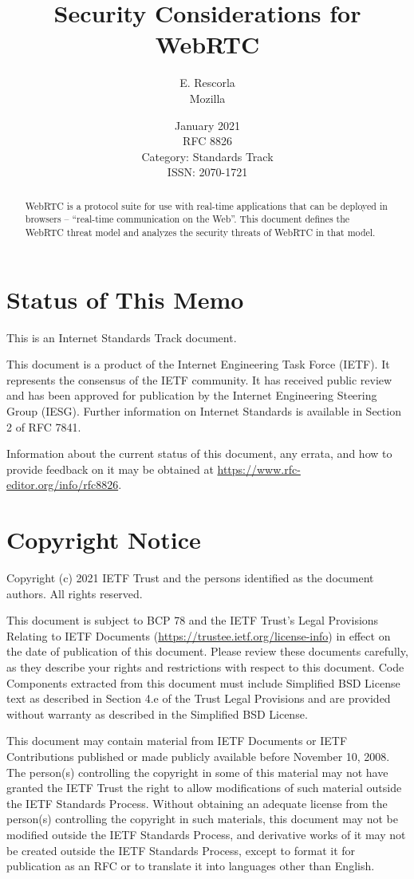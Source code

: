\documentclass{article}
\title{Security Considerations for WebRTC}
\author{E. Rescorla \\
Mozilla}
\date{January 2021 \\ RFC 8826 \\ Category: Standards Track \\ ISSN: 2070-1721}
\begin{document}
\maketitle

\begin{abstract}
WebRTC is a protocol suite for use with real-time applications that
can be deployed in browsers -- ``real-time communication on the Web''.
This document defines the WebRTC threat model and analyzes the
security threats of WebRTC in that model.
\end{abstract}

\section*{Status of This Memo}

This is an Internet Standards Track document.

This document is a product of the Internet Engineering Task Force
(IETF).  It represents the consensus of the IETF community.  It has
received public review and has been approved for publication by the
Internet Engineering Steering Group (IESG).  Further information on
Internet Standards is available in Section 2 of RFC 7841.

Information about the current status of this document, any errata,
and how to provide feedback on it may be obtained at
\url{https://www.rfc-editor.org/info/rfc8826}.

\section*{Copyright Notice}

Copyright (c) 2021 IETF Trust and the persons identified as the
document authors.  All rights reserved.

This document is subject to BCP 78 and the IETF Trust's Legal
Provisions Relating to IETF Documents
(\url{https://trustee.ietf.org/license-info}) in effect on the date of
publication of this document.  Please review these documents
carefully, as they describe your rights and restrictions with respect
to this document.  Code Components extracted from this document must
include Simplified BSD License text as described in Section 4.e of
the Trust Legal Provisions and are provided without warranty as
described in the Simplified BSD License.

This document may contain material from IETF Documents or IETF
Contributions published or made publicly available before November
10, 2008.  The person(s) controlling the copyright in some of this
material may not have granted the IETF Trust the right to allow
modifications of such material outside the IETF Standards Process.
Without obtaining an adequate license from the person(s) controlling
the copyright in such materials, this document may not be modified
outside the IETF Standards Process, and derivative works of it may
not be created outside the IETF Standards Process, except to format
it for publication as an RFC or to translate it into languages other
than English.
\end{document}
